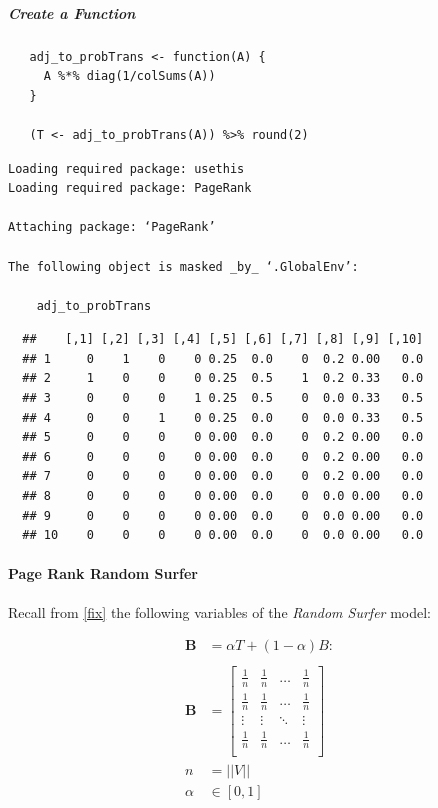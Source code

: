 \documentclass[11pt]{article}
\begin{document}
\subparagraph{Create a Function}
\label{create-a-function}
\begin{verbatim}
   adj_to_probTrans <- function(A) {
     A %*% diag(1/colSums(A))
   }

   (T <- adj_to_probTrans(A)) %>% round(2)
\end{verbatim}

\begin{verbatim}
Loading required package: usethis
Loading required package: PageRank

Attaching package: ‘PageRank’

The following object is masked _by_ ‘.GlobalEnv’:

    adj_to_probTrans
\end{verbatim}


\begin{verbatim}
  ##    [,1] [,2] [,3] [,4] [,5] [,6] [,7] [,8] [,9] [,10]
  ## 1     0    1    0    0 0.25  0.0    0  0.2 0.00   0.0
  ## 2     1    0    0    0 0.25  0.5    1  0.2 0.33   0.0
  ## 3     0    0    0    1 0.25  0.5    0  0.0 0.33   0.5
  ## 4     0    0    1    0 0.25  0.0    0  0.0 0.33   0.5
  ## 5     0    0    0    0 0.00  0.0    0  0.2 0.00   0.0
  ## 6     0    0    0    0 0.00  0.0    0  0.2 0.00   0.0
  ## 7     0    0    0    0 0.00  0.0    0  0.2 0.00   0.0
  ## 8     0    0    0    0 0.00  0.0    0  0.0 0.00   0.0
  ## 9     0    0    0    0 0.00  0.0    0  0.0 0.00   0.0
  ## 10    0    0    0    0 0.00  0.0    0  0.0 0.00   0.0
\end{verbatim}

\paragraph{Page Rank Random Surfer}
\label{page-rank-random-surfer}
Recall from \ref{fix} the following variables of the \emph{Random Surfer} model:


\begin{align}
    \mathbf{B} &= \alpha T +  \left( 1- \alpha \right)B :\\
\ \\
    \mathbf{B}&= \begin{bmatrix}
    \frac{1}{n} & \frac{1}{n} & \ldots & \frac{1}{n} \\
    \frac{1}{n} & \frac{1}{n} & \ldots & \frac{1}{n} \\
        \vdots      & \vdots      & \ddots & \vdots  \\
    \frac{1}{n} & \frac{1}{n} & \ldots & \frac{1}{n} \\
    \end{bmatrix} \label{eq:bgval1} \\
    n&= \left| \left| V \right| \right| \\
    \alpha &\in [0,1]
\end{align}
\end{document}
